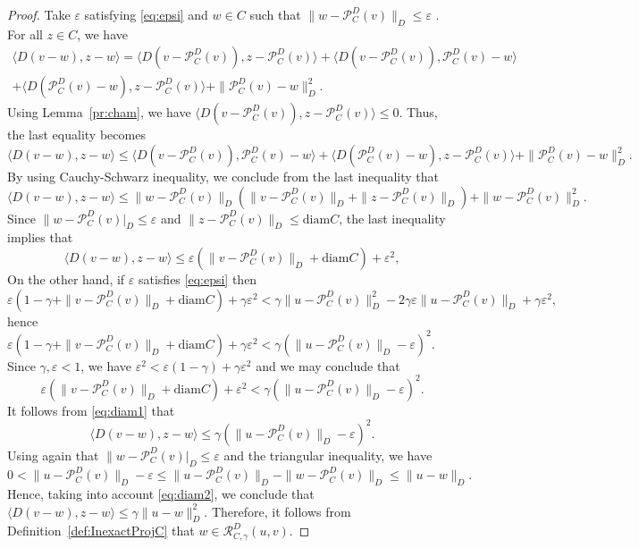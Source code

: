 \begin{proof}
	Take $\varepsilon$ satisfying \eqref{eq:epsi} and $w\in C$ such that  $\|w-\mathcal{P}_C^D(v)\|_D\leq \varepsilon$ . For all $z\in C$, we have
	\begin{multline*}
		\langle D(v-w), z-w \rangle = \langle D(v-\mathcal{P}_C^D(v)),z-\mathcal{P}_C^D(v) \rangle + \langle D(v-\mathcal{P}_C^D(v)), \mathcal{P}_C^D(v) -w \rangle\\
		+ \langle D(\mathcal{P}_C^D(v) - w), z- \mathcal{P}_C^D(v) \rangle +\| \mathcal{P}_C^D(v)-w\|_D^2.
	\end{multline*}
	Using Lemma~\ref{pr:cham},  we have $\langle D(v-\mathcal{P}_C^D(v)),z-\mathcal{P}_C^D(v) \rangle\leq 0$. Thus, the last equality becomes
	$$
		\langle D(v-w), z-w \rangle \leq \langle D(v-\mathcal{P}_C^D(v)), \mathcal{P}_C^D(v) -w \rangle + \langle D(\mathcal{P}_C^D(v) - w), z- \mathcal{P}_C^D(v) \rangle +\| \mathcal{P}_C^D(v)-w\|_D^2.
	$$
	By using Cauchy-Schwarz inequality, we conclude from the last inequality that
	$$
		\langle D(v-w), z-w \rangle \leq  \|w-\mathcal{P}_C^D(v) \|_D\left(\|v-\mathcal{P}_C^D(v)\|_D+ \|z- \mathcal{P}_C^D(v)\|_D\right) +\|w-\mathcal{P}_C^D(v)\|_D^2.
	$$
	Since $\|w-\mathcal{P}_C^D(v)|_D\leq \varepsilon$ and $ \|z- \mathcal{P}_C^D(v)\|_D\leq \mbox{diam} C$, the last inequality implies that
	\begin{equation}\label{eq:diam1}
		\langle D(v-w), z-w \rangle \leq \varepsilon \left(\|v-\mathcal{P}_C^D(v)\|_D+\mbox{diam}C\right)+\varepsilon^2,
	\end{equation}
	On the other hand, if $\varepsilon$ satisfies \eqref{eq:epsi} then
	$$
		\varepsilon \left( 1-\gamma+\|v-\mathcal{P}_C^D(v)\|_D+ \mbox{diam} C\right) + \gamma \varepsilon^2 <
		\gamma\|u-\mathcal{P}_C^D(v)\|_D^2-2	\gamma\varepsilon\|u-\mathcal{P}_C^D(v)\|_D +\gamma\varepsilon^2,
	$$
	hence
	$
		\varepsilon \left( 1-\gamma+\|v-\mathcal{P}_C^D(v)\|_D+ \mbox{diam} C\right) + \gamma \varepsilon^2 < \gamma\left(\|u-\mathcal{P}_C^D(v)\|_D-\varepsilon\right)^2.
	$
	Since $\gamma, \varepsilon<1$, we have  $\varepsilon^2 < \varepsilon(1-\gamma) + \gamma \varepsilon^2$ and we may conclude that
	$$
		\varepsilon \left( \|v-\mathcal{P}_C^D(v)\|_D+ \mbox{diam} C\right) + \varepsilon^2 <
		\gamma\left(\|u-\mathcal{P}_C^D(v)\|_D-\varepsilon\right)^2.
	$$
	It follows from \eqref{eq:diam1} that
	\begin{equation}\label{eq:diam2}
		\langle D(v-w), z-w \rangle \leq \gamma\left(\|u-\mathcal{P}_C^D(v)\|_D-\varepsilon\right)^2.
	\end{equation}
	Using again that $\|w-\mathcal{P}_C^D(v)|_D\leq \varepsilon$ and the triangular inequality, we have
	$$
		0<\|u-\mathcal{P}_C^D(v)\|_D -\varepsilon \leq \|u-\mathcal{P}_C^D(v)\|_D -\|w-\mathcal{P}_C^D(v)\|_D \leq \|u-w\|_D.
	$$
	Hence,   taking into account  \eqref{eq:diam2}, we conclude that $	\langle D(v-w), z-w \rangle \leq \gamma\|u-w\|_D^2$. Therefore, it follows from Definition~\ref{def:InexactProjC} that    $w\in\mathcal{R}_{C,\gamma}^D(u, v)$.
\end{proof}
